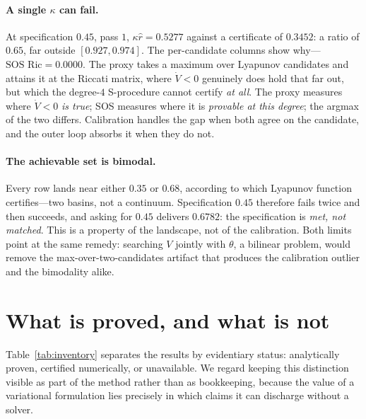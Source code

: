 \documentclass[11pt]{article}
\theoremstyle{plain}
\theoremstyle{definition}
\newcommand{\Vdot}{\dot{V}}
\begin{document}
\paragraph{A single $\kappa$ can fail.} At specification $0.45$, pass $1$,
$\kappa\hat r=0.5277$ against a certificate of $0.3452$: a ratio of $0.65$, far
outside $[0.927,0.974]$. The per-candidate columns show why---$\text{SOS
Ric}=0.0000$. The proxy takes a maximum over Lyapunov candidates and attains it
at the Riccati matrix, where $\Vdot<0$ genuinely does hold that far out, but
which the degree-$4$ S-procedure cannot certify \emph{at all}. The proxy
measures where $\Vdot<0$ \emph{is true}; SOS measures where it is \emph{provable
at this degree}; the argmax of the two differs. Calibration handles the gap when
both agree on the candidate, and the outer loop absorbs it when they do not.

\paragraph{The achievable set is bimodal.} Every row lands near either $0.35$ or
$0.68$, according to which Lyapunov function certifies---two basins, not a
continuum. Specification $0.45$ therefore fails twice and then succeeds, and
asking for $0.45$ delivers $0.6782$: the specification is \emph{met, not
matched}. This is a property of the landscape, not of the calibration. Both
limits point at the same remedy: searching $V$ jointly with $\theta$, a bilinear
problem, would remove the max-over-two-candidates artifact that produces the
calibration outlier and the bimodality alike.

\section{What is proved, and what is not}
\label{sec:inventory}

Table~\ref{tab:inventory} separates the results by evidentiary status:
analytically proven, certified numerically, or unavailable. We regard keeping
this distinction visible as part of the method rather than as bookkeeping,
because the value of a variational formulation lies precisely in which claims it
can discharge without a solver.
\end{document}
